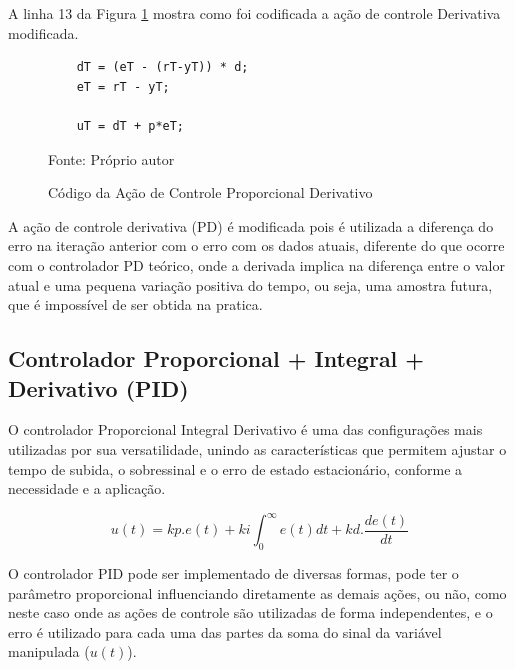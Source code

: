  A linha 13 da Figura \ref{fig:codigoControladorPD} mostra como foi codificada a ação de controle Derivativa modificada.

\begin{figure}[!htb]
\centering
\caption{Código da Ação de Controle Proporcional Derivativo}
\begin{minipage}{0.8\linewidth}
\lstset{firstnumber=13}
\begin{lstlisting}
    dT = (eT - (rT-yT)) * d;
    eT = rT - yT;

    uT = dT + p*eT;
\end{lstlisting}
\end{minipage}
\label{fig:codigoControladorPD}

{\small Fonte: Próprio autor}
\end{figure}

A ação de controle derivativa (PD) é modificada pois é utilizada a diferença do erro na iteração anterior com o erro com os dados atuais, diferente do que ocorre com o controlador PD teórico, onde a derivada implica na diferença entre o valor atual e uma pequena variação positiva do tempo, ou seja, uma amostra futura, que é impossível de ser obtida na pratica. 










\subsection{ Controlador Proporcional + Integral + Derivativo (PID) }

O controlador Proporcional Integral Derivativo é uma das configurações mais utilizadas por sua versatilidade, unindo as características que permitem ajustar o tempo de subida, o sobressinal e o erro de estado estacionário, conforme a necessidade e a aplicação.

\begin{equation}
u(t) = kp.e(t) + ki \int_{0}^{\infty} e(t) dt + kd. \frac{d e(t)}{dt}
\end{equation}

O controlador PID pode ser implementado de diversas formas, pode ter o parâmetro proporcional influenciando diretamente as demais ações, ou não, como neste caso onde as ações de controle são utilizadas de forma independentes, e o erro é utilizado para cada uma das partes da soma do sinal da variável manipulada ($u(t)$).

